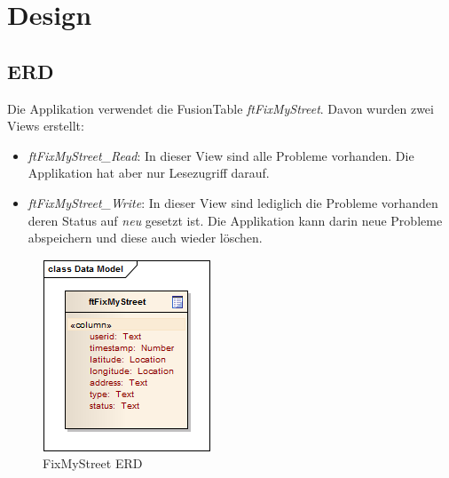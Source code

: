 \begin{figure}[!h]
\end{figure}

\section{Design}

\subsection{ERD}
Die Applikation verwendet die FusionTable \emph{ftFixMyStreet}. Davon wurden zwei Views erstellt:

\begin{itemize}
\item \emph{ftFixMyStreet\_Read}: In dieser View sind alle Probleme vorhanden. Die Applikation hat aber nur Lesezugriff darauf.
\item \emph{ftFixMyStreet\_Write}: In dieser View sind lediglich die Probleme vorhanden deren Status auf \emph{neu} gesetzt ist. Die Applikation kann darin neue Probleme abspeichern und diese auch wieder löschen.
\end{itemize}

\begin{figure}[h!]
	\centering
	\includegraphics{images/usecase2-fixmystreet/uml/fixmystreet-erd.png}
	\caption{FixMyStreet ERD}
	\label{fixmystreet-erd}
\end{figure}

